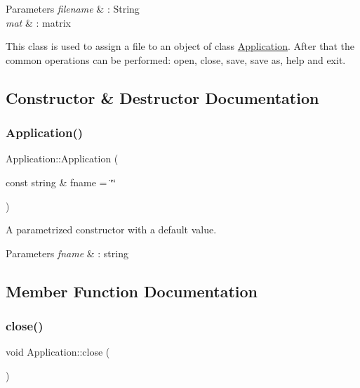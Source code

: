 \begin{DoxyParams}{Parameters}
{\em filename} & \+: String \\
\hline
{\em mat} & \+: matrix\\
\hline
\end{DoxyParams}
This class is used to assign a file to an object of class \hyperlink{class_application}{Application}. After that the common operations can be performed\+: open, close, save, save as, help and exit. 

\subsection{Constructor \& Destructor Documentation}
\mbox{\label{class_application_ade4650e7378dae1d94794b86995fd571}} 
\subsubsection{\texorpdfstring{Application()}{Application()}}
{\footnotesize\ttfamily Application\+::\+Application (\begin{DoxyParamCaption}\item[{const string \&}]{fname = {\ttfamily \char`\"{}\char`\"{}} }\end{DoxyParamCaption})\hspace{0.3cm}{\ttfamily [explicit]}}

A parametrized constructor with a default value. 
\begin{DoxyParams}{Parameters}
{\em fname} & \+: string \\
\hline
\end{DoxyParams}


\subsection{Member Function Documentation}
\mbox{\label{class_application_a5a7dcf61b6701a2b2665c78e4e074e73}} 
\subsubsection{\texorpdfstring{close()}{close()}}
{\footnotesize\ttfamily void Application\+::close (\begin{DoxyParamCaption}{ }\end{DoxyParamCaption})\hspace{0.3cm}{\ttfamily [private]}}

